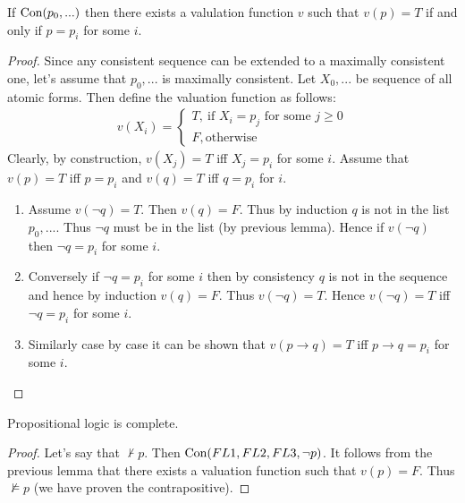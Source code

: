 \begin{lemma}\label{lem:com3}
  If $\text{Con}(p_0,...)$ then there exists a valulation function $v$ such that $v(p) = T$ if and only if $p = p_i$ for some $i$.
\end{lemma}
\begin{proof}
  Since any consistent sequence can be extended to a maximally consistent one, let's assume that $p_0,...$ is maximally consistent. Let $X_0,...$ be sequence of all atomic forms. Then define the valuation function as follows:
  \begin{align*}
    v(X_i) = \begin{cases}
      T,\ \text{if $X_i= p_j$ for some $j\geq 0$}\\
      F, \text{otherwise} 
    \end{cases}
  \end{align*}
  Clearly, by construction, $v(X_j) = T$ iff $X_j = p_i$ for some $i$. Assume that $v(p) = T$ iff $p = p_i$ and $v(q) = T$ iff $q = p_i$ for $i$.
  \begin{enumerate}
    \item Assume $v(\lnot q) =T$. Then $v(q) = F$. Thus by induction $q$ is not in the list $p_0,...$. Thus $\lnot q$ must be in the list (by previous lemma). Hence if $v(\lnot q)$ then $\lnot q = p_i$ for some $i$. 
    \item Conversely if $\lnot q = p_i$ for some $i$ then by consistency $q$ is not in the sequence and hence by induction $v(q) = F$. Thus $v(\lnot q) = T$. Hence $v(\lnot q) = T$ iff $\lnot q = p_i$ for some $i$.
    \item Similarly case by case it can be shown that $v(p\to q) =T$ iff $p\to q = p_i$ for some $i$.
  \end{enumerate}
\end{proof}
\begin{theorem}
  Propositional logic is complete.
\end{theorem}
\begin{proof}
  Let's say that $\nvdash p$. Then $\text{Con}(FL1, FL2, FL3, \lnot p)$. It follows from the previous lemma that there exists a valuation function such that $v(p) = F$. Thus $\nvDash p$ (we have proven the contrapositive). 
\end{proof}

